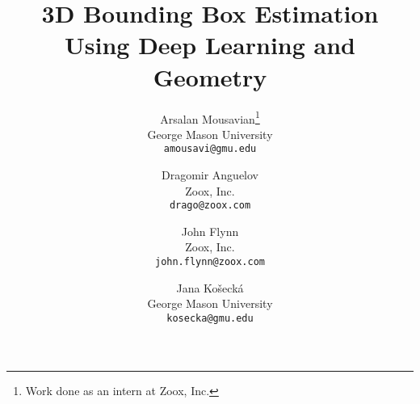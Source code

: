 \documentclass[10pt,twocolumn,letterpaper]{article}
\begin{document}
\title{3D Bounding Box Estimation Using Deep Learning and Geometry}

\author{Arsalan Mousavian\thanks{Work done as an intern at Zoox, Inc.}\\
George Mason University\\
{\tt\small amousavi@gmu.edu}
\and
Dragomir Anguelov\\
Zoox, Inc.\\
{\tt\small drago@zoox.com}
\and
John Flynn\\
Zoox, Inc.\\
{\tt\small john.flynn@zoox.com}
\and
Jana  Ko\v{s}eck\'a\\
George Mason University\\
{\tt\small kosecka@gmu.edu}
}

\maketitle
{}
\iftrue
\newcommand{\john}[1]{\textsf{\textcolor{john_color}{[{\bf John }: #1]}}}
\newcommand{\arsalan}[1]{\textsf{\textcolor{arsalan_color}{[{\bf Arsalan}: #1]}}}
\newcommand{\jana}[1]{\textsf{\textcolor{jana_color}{[{\bf Jana}: #1]}}}
\newcommand{\drago}[1]{\textsf{\textcolor{drago_color}{[{\bf Drago}: #1]}}}
\else
\newcommand{\john}[1]{}
\newcommand{\jana}[1]{}
\newcommand{\arsalan}[1]{}
\newcommand{\drago}[1]{}
\fi
\end{document}
